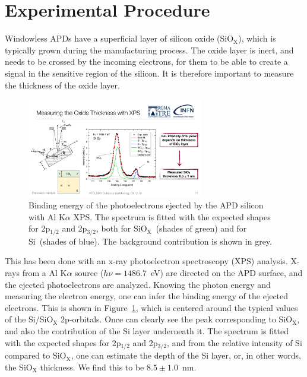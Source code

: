 \documentclass[12p]{paper}
\begin{document}
\section{Experimental Procedure}


Windowless APDs have a superficial layer of silicon oxide (SiO$_\mathrm{X}$), which is typically grown during the manufacturing process. The oxide layer is inert, and needs to be crossed by the incoming electrons, for them to be able to create a signal in the sensitive region of the silicon. It is therefore important to measure the thickness of the oxide layer.

\begin{figure}[tb]
  \centering
\includegraphics[width=0.69\textwidth]{figures/oxideLayer}
 \caption{Binding energy of the photoelectrons ejected by the APD silicon with Al K$\alpha$ XPS. The spectrum is fitted with the expected shapes for 2p$_{1/2}$ and 2p$_{3/2}$, both for SiO$_\mathrm{X}$~(shades of green) and for Si~(shades of blue). The background contribution is shown in grey. 
  \label{fig:oxideLayer}}
\end{figure}



This has been done with an x-ray photoelectron spectroscopy (XPS) analysis. X-rays from a Al K$\alpha$ source ($h\nu = 1486.7$~eV) are directed on the APD surface, and the ejected photoelectrons are analyzed. Knowing the photon energy and measuring the electron energy, one can infer the binding energy of the ejected electrons. This is shown in Figure~\ref{fig:oxideLayer}, which is centered around the typical values of the Si/SiO$_\mathrm{X}$ 2p-orbitals. Once can clearly see the peak corresponding to SiO$_\mathrm{X}$, and also the contribution of the Si layer underneath it. The spectrum is fitted with the expected shapes for 2p$_{1/2}$ and 2p$_{3/2}$, and from the relative intensity of Si compared to SiO$_\mathrm{X}$, one can estimate the depth of the Si layer, or, in other words, the SiO$_\mathrm{X}$ thickness. We find this to be $8.5 \pm 1.0$~nm.
\end{document}
